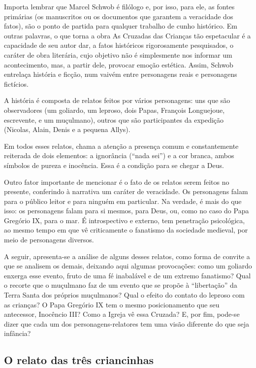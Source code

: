\documentclass[12pt]{extarticle}
\begin{document}
Importa lembrar que Marcel Schwob é filólogo e, por isso, para ele, as
fontes primárias (os manuscritos ou os documentos que garantem a
veracidade dos fatos), são o ponto de partida para qualquer trabalho de
cunho histórico. Em outras palavras, o que torna a obra As Cruzadas das
Crianças tão espetacular é a capacidade de seu autor dar, a fatos
históricos rigorosamente pesquisados, o caráter de obra literária, cujo
objetivo não é simplesmente nos informar um acontecimento, mas, a partir
dele, provocar emoção estética. Assim, Schwob entrelaça história e
ficção, num vaivém entre personagens reais e personagens fictícios.

A história é composta de relatos feitos por vários personagens: uns que
são observadores (um goliardo, um leproso, dois Papas, François
Longuejoue, escrevente, e um muçulmano), outros que são participantes da
expedição (Nicolas, Alain, Denis e a pequena Allys).

Em todos esses relatos, chama a atenção a presença comum e
constantemente reiterada de dois elementos: a ignorância (``nada sei'')
e a cor branca, ambos símbolos de pureza e inocência. Essa é a condição
para se chegar a Deus.

Outro fator importante de mencionar é o fato de os relatos serem feitos
no presente, conferindo à narrativa um caráter de veracidade. Os
personagens falam para o público leitor e para ninguém em particular. Na
verdade, é mais do que isso: os personagens falam para si mesmos, para
Deus, ou, como no caso do Papa Gregório IX, para o mar. É introspectivo
e externo, tem penetração psicológica, ao mesmo tempo em que vê
criticamente o fanatismo da sociedade medieval, por meio de personagens
diversos.

A seguir, apresenta-se a análise de alguns desses relatos, como forma de
convite a que se analisem os demais, deixando aqui algumas provocações:
como um goliardo enxerga esse evento, fruto de uma fé inabalável e de um
extremo fanatismo? Qual o recorte que o muçulmano faz de um evento que
se propõe à ``libertação'' da Terra Santa dos próprios muçulmanos? Qual
o efeito do contato do leproso com as crianças? O Papa Gregório IX tem o
mesmo posicionamento que seu antecessor, Inocêncio III? Como a Igreja vê
essa Cruzada? E, por fim, pode-se dizer que cada um dos
personagens-relatores tem uma visão diferente do que seja infância?

\subsection{O relato das três criancinhas}
\end{document}
